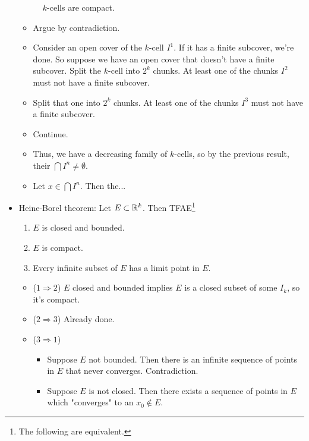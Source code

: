 \documentclass[../../notes.tex]{subfiles}
\begin{document}
\begin{itemize}
\begin{figure}[H]
        \caption{$k$-cells are compact.}
        \label{fig:kcellCompact}
    \end{figure}
    \begin{itemize}
        \item Argue by contradiction.
        \item Consider an open cover of the $k$-cell $I^1$. If it has a finite subcover, we're done. So suppose we have an open cover that doesn't have a finite subcover. Split the $k$-cell into $2^k$ chunks. At least one of the chunks $I^2$ must not have a finite subcover.
        \item Split that one into $2^k$ chunks. At least one of the chunks $I^3$ must not have a finite subcover.
        \item Continue.
        \item Thus, we have a decreasing family of $k$-cells, so by the previous result, their $\bigcap I^n\neq\emptyset$.
        \item Let $x\in\bigcap I^n$. Then the...
    \end{itemize}
    \item Heine-Borel theorem: Let $E\subset\mathbb{R}^k$. Then TFAE\footnote{The following are equivalent.}
    \begin{enumerate}
        \item $E$ is closed and bounded.
        \item $E$ is compact.
        \item Every infinite subset of $E$ has a limit point in $E$.
    \end{enumerate}
    \begin{itemize}
        \item ($1\Rightarrow 2$) $E$ closed and bounded implies $E$ is a closed subset of some $I_k$, so it's compact.
        \item ($2\Rightarrow 3$) Already done.
        \item ($3\Rightarrow 1$)
        \begin{itemize}
            \item Suppose $E$ not bounded. Then there is an infinite sequence of points in $E$ that never converges. Contradiction.
            \item Suppose $E$ is not closed. Then there exists a sequence of points in $E$ which "converges" to an $x_0\notin E$.
        \end{itemize}
    \end{itemize}
\end{itemize}
\end{document}
